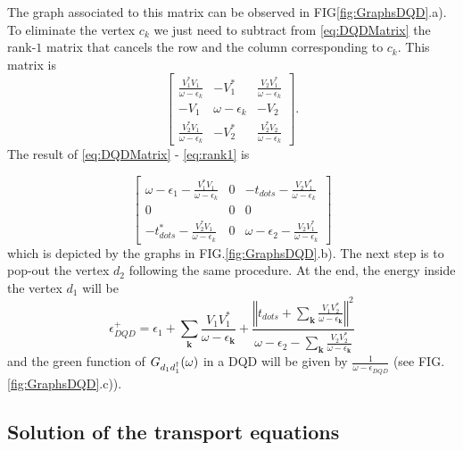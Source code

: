 \documentclass[showpacs,aps,prb,reprint,superscriptaddress]{revtex4-1}
\begin{document}
\noindent The graph associated to this matrix can be observed in FIG\ref{fig:GraphsDQD}.a). To eliminate the vertex $c_k$ we just need to subtract from \eqref{eq:DQDMatrix} the rank-$1$ matrix that cancels the row and the column corresponding to $c_k$. This matrix is 
\begin{equation}
        \left[\begin{array}{ccc}
    \frac{V_{1}^{*}V_{1}}{\omega-\epsilon_{k}} & -V_{1}^{*} & \frac{V_{2}V_{1}^{*}}{\omega-\epsilon_{k}}\\
    -V_{1} & \omega-\epsilon_{k} & -V_{2}\\
    \frac{V_{2}^{*}V_{1}}{\omega-\epsilon_{k}} & -V_{2}^{*} & \frac{V_{2}^{*}V_{2}}{\omega-\epsilon_{k}}
    \end{array}\right]. \label{eq:rank1}
\end{equation}
The result of \eqref{eq:DQDMatrix} -  \eqref{eq:rank1} is 

\begin{equation}
        \left[\begin{array}{ccc}
    \omega-\epsilon_{1}-\frac{V_{1}^{*}V_{1}}{\omega-\epsilon_{k}} & 0 & -t_{dots}-\frac{V_{2}V_{1}^{*}}{\omega-\epsilon_{k}}\\
    0 & 0 & 0\\
    -t_{dots}^{*}-\frac{V_{2}^{*}V_{1}}{\omega-\epsilon_{k}} & 0 & \omega-\epsilon_{2}-\frac{V_{2}V_{1}^{*}}{\omega-\epsilon_{k}}
    \end{array}\right]
\end{equation}
\noindent which is depicted by the graphs in FIG.\ref{fig:GraphsDQD}.b). The next step is to pop-out the vertex $d_2$ following the same procedure. At the end, the energy inside the vertex $d_1$ will be
\begin{equation}
    \epsilon^+_{DQD}=\epsilon_{1}+\sum_{\mathbf{k}}\frac{V_{1}V_{1}^{*}}{\omega-\epsilon_{\mathbf{k}}}+\frac{\left\Vert t_{dots}+\sum_{\mathbf{k}}\frac{V_{1}V_{2}^{*}}{\omega-\epsilon_{\mathbf{k}}}\right\Vert ^{2}}{\omega-\epsilon_{2}-\sum_{\mathbf{k}}\frac{V_{2}V_{2}^{*}}{\omega-\epsilon_{\mathbf{k}}}} \label{eq:EnDQD}
\end{equation}
and the green function of $G_{d_1d^\dagger_1}(\omega)$ in a DQD will be given by $\frac{1}{\omega -  \epsilon_{DQD}}$ (see FIG.\ref{fig:GraphsDQD}.c)).

\subsection{Solution of the transport equations}
\end{document}
